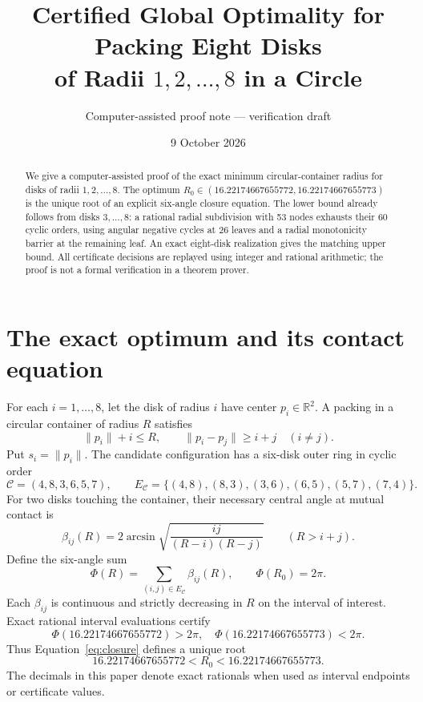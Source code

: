 \documentclass[10pt,a4paper]{article}
\title{Certified Global Optimality for Packing Eight Disks\\of Radii $1,2,\ldots,8$ in a Circle}
\author{Computer-assisted proof note --- verification draft}
\date{9 October 2026}
\newcommand{\Rcrit}{R_0}
\newcommand{\dist}[1]{\lVert #1\rVert}
\begin{document}
\maketitle
\begin{abstract}
We give a computer-assisted proof of the exact minimum circular-container radius for disks of radii $1,2,\ldots,8$. The optimum $R_0\in(16.22174667655772,16.22174667655773)$ is the unique root of an explicit six-angle closure equation. The lower bound already follows from disks $3,\ldots,8$: a rational radial subdivision with 53 nodes exhausts their 60 cyclic orders, using angular negative cycles at 26 leaves and a radial monotonicity barrier at the remaining leaf. An exact eight-disk realization gives the matching upper bound. All certificate decisions are replayed using integer and rational arithmetic; the proof is not a formal verification in a theorem prover.
\end{abstract}

\section{The exact optimum and its contact equation}
For each $i=1,\ldots,8$, let the disk of radius $i$ have center $p_i\in\mathbb R^2$. A packing in a circular container of radius $R$ satisfies
\begin{equation}\label{eq:packing}
 \dist{p_i}+i\le R,\qquad \dist{p_i-p_j}\ge i+j \quad(i\ne j).
\end{equation}
Put $s_i=\dist{p_i}$. The candidate configuration has a six-disk outer ring in cyclic order
\begin{equation}\label{eq:core}
 \mathcal C=(4,8,3,6,5,7),\qquad
 E_{\mathcal C}=\{(4,8),(8,3),(3,6),(6,5),(5,7),(7,4)\}.
\end{equation}
For two disks touching the container, their necessary central angle at mutual contact is
\begin{equation}\label{eq:beta}
 \beta_{ij}(R)=2\arcsin\sqrt{\frac{ij}{(R-i)(R-j)}}
 \qquad (R>i+j).
\end{equation}
Define the six-angle sum
\begin{equation}\label{eq:closure}
 \Phi(R)=\sum_{(i,j)\in E_{\mathcal C}}\beta_{ij}(R),\qquad
 \Phi(\Rcrit)=2\pi.
\end{equation}
Each $\beta_{ij}$ is continuous and strictly decreasing in $R$ on the interval of interest. Exact rational interval evaluations certify
\begin{equation}\label{eq:bracket}
 \Phi(16.22174667655772)>2\pi,\quad
 \Phi(16.22174667655773)<2\pi.
\end{equation}
Thus Equation~\eqref{eq:closure} defines a unique root
\[
16.22174667655772<\Rcrit<16.22174667655773.
\]
The decimals in this paper denote exact rationals when used as interval endpoints or certificate values.
\end{document}
